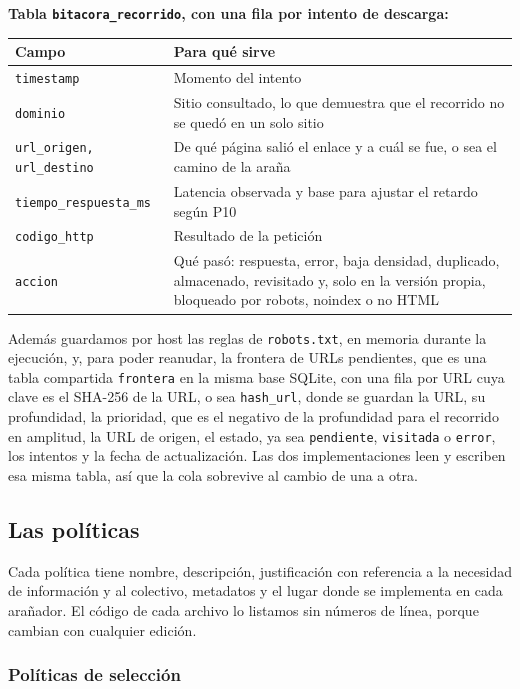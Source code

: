 \documentclass[11pt,spanish]{article}
\begin{document}
\textbf{Tabla \texttt{bitacora\_recorrido}, con una fila por intento de descarga:}

\begin{center}
\begin{tabularx}{\linewidth}{lY}
\toprule
\textbf{Campo} & \textbf{Para qué sirve} \\
\midrule
\texttt{timestamp} & Momento del intento \\
\texttt{dominio} & Sitio consultado, lo que demuestra que el recorrido no se quedó en un solo sitio \\
\texttt{url\_origen, url\_destino} & De qué página salió el enlace y a cuál se fue, o sea el camino de la araña \\
\texttt{tiempo\_respuesta\_ms} & Latencia observada y base para ajustar el retardo según P10 \\
\texttt{codigo\_http} & Resultado de la petición \\
\texttt{accion} & Qué pasó: respuesta, error, baja densidad, duplicado, almacenado, revisitado y, solo en la versión propia, bloqueado por robots, noindex o no HTML \\
\bottomrule
\end{tabularx}
\end{center}

Además guardamos por host las reglas de \texttt{robots.txt}, en memoria durante la ejecución, y, para poder reanudar, la frontera de URLs pendientes, que es una tabla compartida \texttt{frontera} en la misma base SQLite, con una fila por URL cuya clave es el SHA-256 de la URL, o sea \texttt{hash\_url}, donde se guardan la URL, su profundidad, la prioridad, que es el negativo de la profundidad para el recorrido en amplitud, la URL de origen, el estado, ya sea \texttt{pendiente}, \texttt{visitada} o \texttt{error}, los intentos y la fecha de actualización. Las dos implementaciones leen y escriben esa misma tabla, así que la cola sobrevive al cambio de una a otra.

\subsection{Las políticas}

Cada política tiene nombre, descripción, justificación con referencia a la necesidad de información y al colectivo, metadatos y el lugar donde se implementa en cada arañador. El código de cada archivo lo listamos sin números de línea, porque cambian con cualquier edición.

\subsubsection{Políticas de selección}
\end{document}

